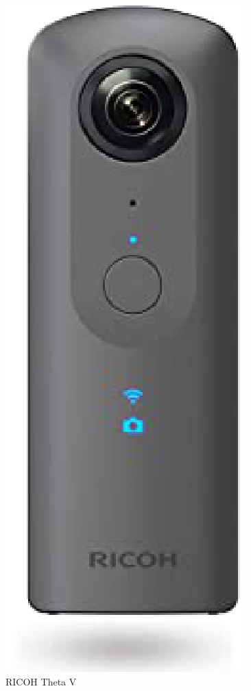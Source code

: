 \documentclass[12pt]{sonota/aislab}
\begin{document}
\begin{figure}
\begin{minipage}{0.4\textwidth}
\begin{center}
\includegraphics[scale=0.3]{figs/theta_v.eps}
\caption{RICOH Theta V}
\label{ThetaV}
\end{center}
\end{minipage}

\end{figure}
\end{document}
